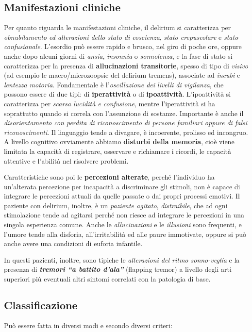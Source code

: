 \subsection{Manifestazioni cliniche}

Per quanto riguarda le manifestazioni cliniche, il delirium si
caratterizza per \emph{obnubilamento ed alterazioni dello stato di
coscienza}, \emph{stato crepuscolare} e \emph{stato confusionale}.
L'esordio può essere rapido e brusco, nel giro di poche ore, oppure
anche dopo alcuni giorni di \emph{ansia}, \emph{insonnia} o
\emph{sonnolenza}, e la fase di stato si caratterizza per la presenza di
\textbf{allucinazioni transitorie}, spesso di tipo di \emph{visivo} (ad
esempio le macro/microzoopsie del delirium tremens), associate ad
\emph{incubi} e \emph{lentezza motoria}. Fondamentale è
l'\emph{oscillazione dei livelli di vigilanza}, che possono essere di
due tipi: di \textbf{iperattività} o di \textbf{ipoattività}.
L'ipoattività si caratterizza per \emph{scarsa lucidità e confusione},
mentre l'iperattività si ha soprattutto quando si correla con
l'assunzione di sostanze. Importante è anche il \emph{disorientamento
con perdita di riconoscimento di persone familiari oppure di falsi
riconoscimenti}. Il linguaggio tende a divagare, è incoerente, prolisso
ed incongruo. A livello cognitivo ovviamente abbiamo \textbf{disturbi
della memoria}, cioè viene limitata la capacità di registrare, osservare
e richiamare i ricordi, le capacità attentive e l'abilità nel risolvere
problemi.

Caratteristiche sono poi le \textbf{percezioni alterate}, perché
l'individuo ha un'alterata percezione per incapacità a discriminare gli
stimoli, non è capace di integrare le percezioni attuali da quelle
passate o dai propri processi emotivi. Il paziente con delirium,
inoltre, è un \emph{paziente agitato}, \emph{distraibile}, che ad ogni
stimolazione tende ad agitarsi perché non riesce ad integrare le
percezioni in una singola esperienza comune. Anche le
\emph{allucinazioni} e le \emph{illusioni} sono frequenti, e l'umore
tende alla disforia, all'irritabilità ed alle paure immotivate, oppure
si può anche avere una condizioni di euforia infantile.

In questi pazienti, inoltre, sono tipiche le \emph{alterazioni del ritmo
sonno-veglia} e la presenza di \textbf{\emph{tremori ``a battito
d'ala''}} (flapping tremor) a livello degli arti superiori più eventuali
altri sintomi correlati con la patologia di base.

\subsection{Classificazione}
Può essere fatta in diversi modi e secondo diversi criteri:

